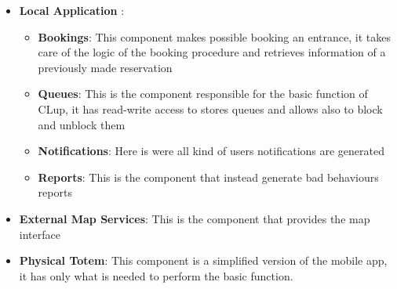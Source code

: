 \begin{itemize}
	\item \textbf{Local Application }:
	\begin{itemize}
		\item \textbf{Bookings}: This component makes possible booking an entrance, it takes care of the logic of the booking procedure and retrieves information of a previously made reservation
		\item \textbf{Queues}: This is the component responsible for the basic function of CLup, it has read-write access to stores queues and allows also to block and unblock them
		\item \textbf{Notifications}: Here is were all kind of users notifications are generated
		\item \textbf{Reports}: This is the component that instead generate bad behaviours reports
	\end{itemize}
	\item \textbf{External Map Services}: This is the component that provides the map interface
	\item \textbf{Physical Totem}: This component is a simplified version of the mobile app, it has only what is needed to perform the basic function.
\end{itemize}

